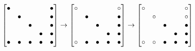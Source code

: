 \documentclass{article}
\begin{document}
\[
\begin{bmatrix}
\bullet & \space & \space & \space & \bullet \\
\space & \bullet & \space & \space & \bullet \\
\space & \space & \bullet & \space & \bullet \\
\space & \space & \space & \bullet & \bullet \\
\bullet & \bullet & \bullet & \bullet & \bullet \\
\end{bmatrix}
\rightarrow
\begin{bmatrix}
\circ & \space & \space & \space & \circ \\
\space & \bullet & \space & \space & \bullet \\
\space & \space & \bullet & \space & \bullet \\
\space & \space & \space & \bullet & \bullet \\
\circ & \bullet & \bullet & \bullet & \bullet \\
\end{bmatrix}
\rightarrow
\begin{bmatrix}
\circ & \space & \space & \space & \circ \\
\space & \circ & \space & \space & \circ \\
\space & \space & \bullet & \space & \bullet \\
\space & \space & \space & \bullet & \bullet \\
\circ & \circ & \bullet & \bullet & \bullet \\
\end{bmatrix}
\]
\end{document}
